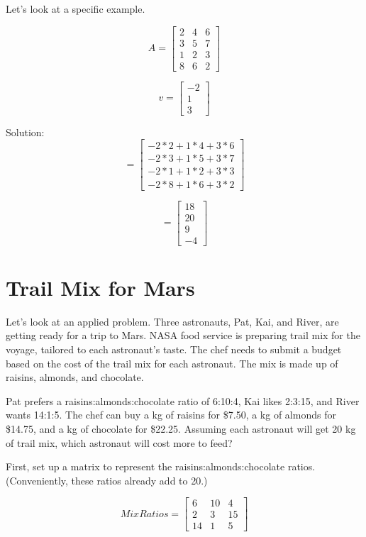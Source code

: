 Let's look at a specific example.

$$A = \begin{bmatrix}
 2  & 4 & 6  \\
 3  & 5 & 7  \\
 1  & 2 & 3  \\
 8  & 6 & 2 
\end{bmatrix}$$

$$v = \begin{bmatrix}
 -2 \\
 1 \\
 3 
\end{bmatrix}$$

Solution:
$$= \begin{bmatrix}
-2*2+1*4+3*6\\
-2*3+1*5+3*7\\
-2*1+1*2+3*3\\
-2*8+1*6+3*2
\end{bmatrix}$$

$$= \begin{bmatrix}
18 \\
20\\
9\\
-4 
\end{bmatrix}$$

\section{Trail Mix for Mars}
Let's look at an applied problem. Three astronauts, Pat, Kai, and River, are getting ready for a trip to Mars. NASA food service is preparing trail mix for the voyage, tailored to each astronaut's taste. The chef needs to submit a budget based on the cost of the trail mix for each astronaut. The mix is made up of raisins, almonds, and chocolate.

Pat prefers a raisins:almonds:chocolate ratio of 6:10:4, Kai likes 2:3:15, and River wants 14:1:5. The chef can buy a kg of raisins for \$7.50, a kg of almonds for \$14.75, and a kg of chocolate for \$22.25. Assuming each astronaut will get 20 kg of trail mix, which astronaut will cost more to feed?

First, set up a matrix to represent the raisins:almonds:chocolate ratios. (Conveniently, these ratios already add to 20.)

$$MixRatios = \begin{bmatrix}
6 & 10 & 4  \\
2 & 3 & 15 \\
14 & 1 & 5
\end{bmatrix}$$

